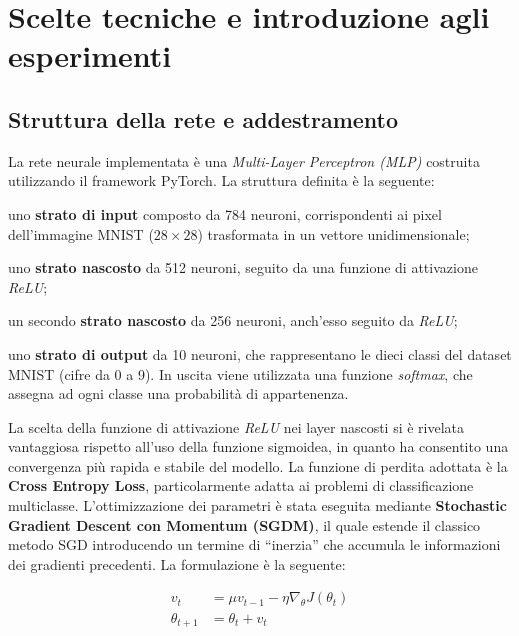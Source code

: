 \chapter{Scelte tecniche e introduzione agli esperimenti}


\section{Struttura della rete e addestramento}
La rete neurale implementata è una \textit{Multi-Layer Perceptron (MLP)} costruita utilizzando il framework PyTorch.  
La struttura definita è la seguente:
\begin{compactitemize}
    \item uno \textbf{strato di input} composto da 784 neuroni, corrispondenti ai pixel dell'immagine MNIST ($28 \times 28$) trasformata in un vettore unidimensionale;
    \item uno \textbf{strato nascosto} da 512 neuroni, seguito da una funzione di attivazione \textit{ReLU};
    \item un secondo \textbf{strato nascosto} da 256 neuroni, anch'esso seguito da \textit{ReLU};
    \item uno \textbf{strato di output} da 10 neuroni, che rappresentano le dieci classi del dataset MNIST (cifre da 0 a 9). In uscita viene utilizzata una funzione \textit{softmax}, che assegna ad ogni classe una probabilità di appartenenza.
\end{compactitemize}

La scelta della funzione di attivazione \textit{ReLU} nei layer nascosti si è rivelata vantaggiosa rispetto all’uso della funzione sigmoidea, in quanto ha consentito una convergenza più rapida e stabile del modello.  
La funzione di perdita adottata è la \textbf{Cross Entropy Loss}, particolarmente adatta ai problemi di classificazione multiclasse.  
L’ottimizzazione dei parametri è stata eseguita mediante \textbf{Stochastic Gradient Descent con Momentum (SGDM)}, il quale estende il classico metodo SGD introducendo un termine di “inerzia” che accumula le informazioni dei gradienti precedenti. La formulazione è la seguente:

\begin{equation}
\begin{aligned}
v_t &= \mu v_{t-1} - \eta \nabla_{\theta} J(\theta_t) \\
\theta_{t+1} &= \theta_t + v_t
\end{aligned}
\end{equation}

